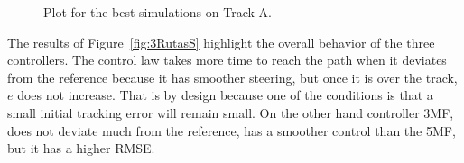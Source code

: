 \documentclass[symmetry,article,submit,moreauthors,pdftex]{Definitions/mdpi}
\begin{document}
\begin{figure}[H]
    \widefigure
     \centering
     \caption{Plot for the best simulations on Track A.}
        \label{fig:3RutasA}
\end{figure}
\begin{paracol}{2}
\linenumbers
\switchcolumn


The results of Figure~\ref{fig:3RutasS} highlight the overall behavior of the
three controllers. The control law takes more time to reach the path when it
deviates from the reference because it has smoother steering, but once it is
over the track, $e$ does not increase.  That is by design because one of the
conditions is that a small initial tracking error will remain small. On the
other hand controller 3MF, does not deviate much from the reference, has a
smoother control than the 5MF, but it has a higher RMSE.

\end{paracol}
\end{document}
